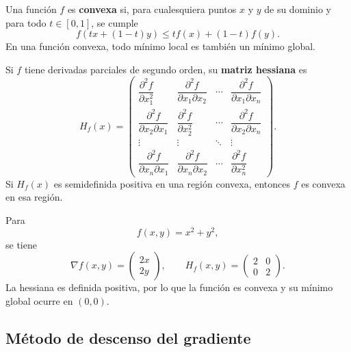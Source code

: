 \documentclass[a4,11pt]{aleph-notas}
\begin{document}
\begin{defi}
    Una función $f$ es \textbf{convexa} si, para cualesquiera puntos ${x}$ y ${y}$ de su dominio y para todo $t\in[0,1]$, se cumple
    \[
        f(t{x}+(1-t){y})
        \leq
        tf({x})+(1-t)f({y}).
    \]
    En una función convexa, todo mínimo local es también un mínimo global.
\end{defi}

\begin{defi}
    Si $f$ tiene derivadas parciales de segundo orden, su \textbf{matriz hessiana} es
    \[
        H_f({x})
        =
        \begin{pmatrix}
            \dfrac{\partial^2 f}{\partial x_1^2} &
            \dfrac{\partial^2 f}{\partial x_1\partial x_2} &
            \cdots &
            \dfrac{\partial^2 f}{\partial x_1\partial x_n}\\[3mm]
            \dfrac{\partial^2 f}{\partial x_2\partial x_1} &
            \dfrac{\partial^2 f}{\partial x_2^2} &
            \cdots &
            \dfrac{\partial^2 f}{\partial x_2\partial x_n}\\
            \vdots & \vdots & \ddots & \vdots\\
            \dfrac{\partial^2 f}{\partial x_n\partial x_1} &
            \dfrac{\partial^2 f}{\partial x_n\partial x_2} &
            \cdots &
            \dfrac{\partial^2 f}{\partial x_n^2}
        \end{pmatrix}.
    \]
    Si $H_f({x})$ es semidefinida positiva en una región convexa, entonces $f$ es convexa en esa región.
\end{defi}

\begin{ejem}
    Para
    \[
        f(x,y)=x^2+y^2,
    \]
    se tiene
    \[
        \nabla f(x,y)=
        \begin{pmatrix}
            2x\\
            2y
        \end{pmatrix},
        \qquad
        H_f(x,y)=
        \begin{pmatrix}
            2 & 0\\
            0 & 2
        \end{pmatrix}.
    \]
    La hessiana es definida positiva, por lo que la función es convexa y su mínimo global ocurre en $(0,0)$.
\end{ejem}

\subsection{Método de descenso del gradiente}
\end{document}
